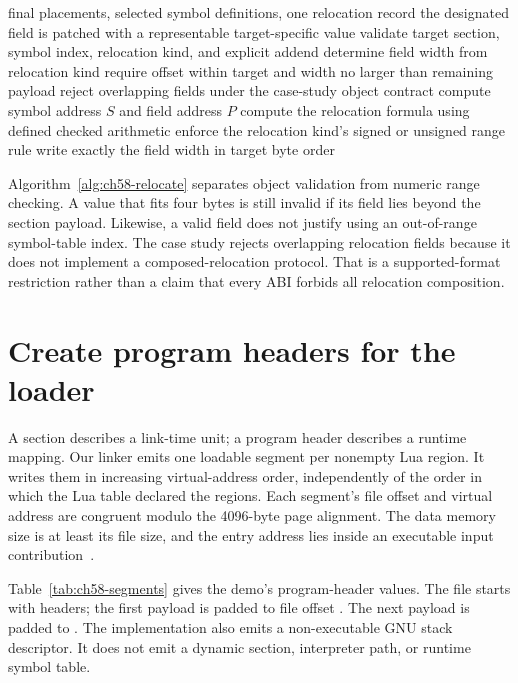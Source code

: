 \begin{algorithm}[htbp]
\caption{Apply one relocation only after validating its object-level and arithmetic contracts.}
\label{alg:ch58-relocate}
\begin{pseudocode}
\Require final placements, selected symbol definitions, one relocation record
\Ensure the designated field is patched with a representable target-specific value
\State validate target section, symbol index, relocation kind, and explicit addend
\State determine field width from relocation kind
\State require offset within target and width no larger than remaining payload
\State reject overlapping fields under the case-study object contract
\State compute symbol address $S$ and field address $P$
\State compute the relocation formula using defined checked arithmetic
\State enforce the relocation kind's signed or unsigned range rule
\State write exactly the field width in target byte order
\end{pseudocode}
\end{algorithm}

Algorithm~\ref{alg:ch58-relocate} separates object validation from numeric range checking.
A value that fits four bytes is still invalid if its field lies beyond the section payload.
Likewise, a valid field does not justify using an out-of-range symbol-table index.
The case study rejects overlapping relocation fields because it does not implement a composed-relocation protocol.
That is a supported-format restriction rather than a claim that every ABI forbids all relocation composition.

\section{Create program headers for the loader}
\label{sec:ch58-segments}

A section describes a link-time unit; a  program header describes a runtime mapping.
Our linker emits one loadable segment per nonempty Lua region.
It writes them in increasing virtual-address order, independently of the order in which the Lua table declared the regions.
Each segment's file offset and virtual address are congruent modulo the 4096-byte page alignment.
The data memory size is at least its file size, and the entry address lies inside an executable input contribution~\cite{xinuos-2026-elf}.

Table~\ref{tab:ch58-segments} gives the demo's program-header values.
The file starts with headers; the first payload is padded to file offset .
The next payload is padded to .
The implementation also emits a non-executable GNU stack descriptor.
It does not emit a dynamic section, interpreter path, or runtime symbol table.

